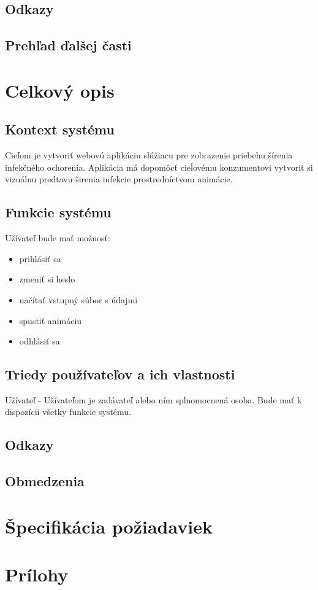 \documentclass[12pt,a4paper]{report}
\begin{document}
\section[Odkazy]{\rmfamily\bfseries
	Odkazy}

\section[Prehľad ďalšej časti]{\rmfamily\bfseries
	Prehľad ďalšej časti}


\renewcommand{\chaptername}{}	
\chapter[Celkový opis]{\rmfamily\bfseries
	Celkový opis}

\section[Kontext systému]{\rmfamily\bfseries
	Kontext systému}
	Cieľom je vytvoriť webovú aplikáciu slúžiacu pre zobrazenie priebehu šírenia infekčného ochorenia. Aplikácia má dopomôcť cieĺovému konzumentovi vytvoriť si vizuálnu predtavu širenia infekcie prostredníctvom animácie.

\section[Funkcie systému]{\rmfamily\bfseries
	Funkcie systému}
Užívateľ bude mať možnosť:
\begin{itemize}
	\item prihlásiť sa 
	\item zmeniť si heslo
	\item načítať vstupný súbor s údajmi
	\item spustiť animáciu
	\item odhlásiť sa
\end{itemize}

\section[Triedy používateľov a ich vlastnosti]{\rmfamily\bfseries
	Triedy používateľov a ich vlastnosti}
Užívateľ - Užívateľom je zadávateľ alebo ním splnomocnená osoba. Bude mať k dispozícii všetky funkcie systému.

\section[Odkazy]{\rmfamily\bfseries
	Odkazy}

\section[Obmedzenia]{\rmfamily\bfseries
	Obmedzenia}

\renewcommand{\chaptername}{}	
\chapter[Špecifikácia požiadaviek]{\rmfamily\bfseries
	Špecifikácia požiadaviek}

\renewcommand{\chaptername}{}	
\chapter[Prílohy]{\rmfamily\bfseries
	Prílohy}
\end{document}
